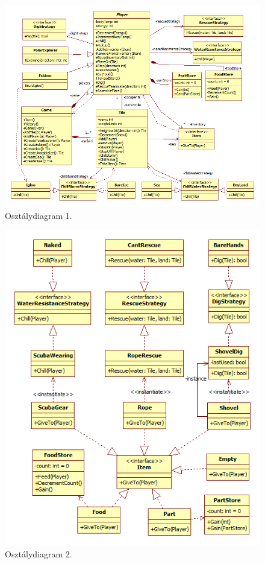 \begin{figure}[H]
	\begin{center}
		\includegraphics[angle=90, scale=0.76]{chapters/chapter04/ClassDiagramPart1.png}
		\caption{Osztálydiagram 1.}
		\label{fig:OsztalyDiagramPart1}
	\end{center}
\end{figure}
\begin{figure}[H]
	\begin{center}
		\includegraphics[width=17cm]{chapters/chapter04/ClassDiagramPart2.png}
		\caption{Osztálydiagram 2.}
		\label{fig:OsztalyDiagramPart2}
	\end{center}
\end{figure}

